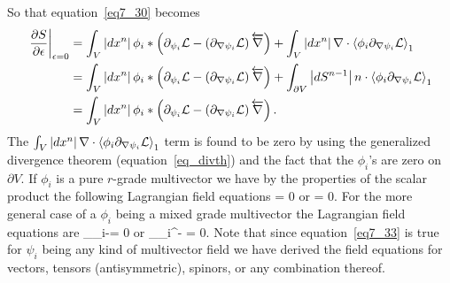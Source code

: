 So that equation~\ref{eq7_30} becomes
\begin{align}
	\left . {\displaystyle\frac{\partial{S}}{\partial{\epsilon}}} \right |_{\epsilon=0} &= 
	                       \int_{V}\left | {dx^{n}} \right |\phi_{i}*\left ( {\partial_{\psi_{i}}\mathcal{L}-\left ( {\partial_{{\mathbf \nabla}\psi_{i}}\mathcal{L}} \right )\overleftarrow{\nabla}} \right )
	                       +\int_{V}\left | {dx^{n}} \right |\nabla\cdot\left \langle {\phi_{i}\partial_{\nabla\psi_{i}}\mathcal{L}} \right \rangle_{1} \nonumber \\
	                    &= \int_{V}\left | {dx^{n}} \right |\phi_{i}*\left ( {\partial_{\psi_{i}}\mathcal{L}-\left ( {\partial_{{\mathbf \nabla}\psi_{i}}\mathcal{L}} \right )\overleftarrow{\nabla}} \right )
	                       +\int_{\partial V}\left | {dS^{n-1}} \right |n\cdot\left \langle {\phi_{i}\partial_{\nabla\psi_{i}}\mathcal{L}} \right \rangle_{1} \nonumber \\
	                    &= \int_{V}\left | {dx^{n}} \right |\phi_{i}*\left ( {\partial_{\psi_{i}}\mathcal{L}-\left ( {\partial_{{\mathbf \nabla}\psi_{i}}\mathcal{L}} \right )\overleftarrow{\nabla}} \right ) \label{eq7_32}.
\end{align}
The $\int_{V}\left | {dx^{n}} \right |\nabla\cdot\left \langle {\phi_{i}\partial_{\nabla\psi_{i}}\mathcal{L}} \right \rangle_{1}$ term is found to be zero by using the generalized divergence theorem (equation~\ref{eq_divth}) and the
fact that the $\phi_{i}$'s are zero on $\partial V$.  If $\phi_{i}$ is a pure $r$-grade multivector we have by the properties of
the scalar product the following Lagrangian field equations
\be
	 = 0\label{eq7_33a}
\ee
or
\be
	 = 0.\label{eq7_34b}
\ee
For the more general case of a $\phi_{i}$ being a mixed grade multivector the Lagrangian field equations are
\be
	\partial_{\psi_{i}}\Lf-\lgrad = 0\label{eq7_33}
\ee
or
\be
	\partial_{\psi_{i}^{\R}}\Lf-\nabla{} = 0.\label{eq7_34}
\ee
Note that since equation~\ref{eq7_33} is true for $\psi_{i}$ being any kind of multivector field we have derived the field equations for vectors, tensors (antisymmetric), spinors, or any combination thereof.
